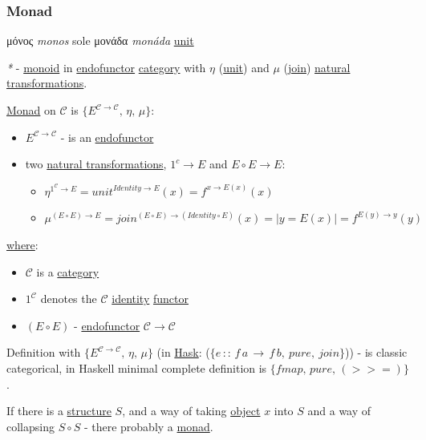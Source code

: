 \documentclass[a4paper,14pt,oneside]{book}
\begin{document}
\subsubsection{\label{orged38b8b}Monad}
\label{sec:org4ab8bff}
μόνος \emph{monos} sole
μονάδα \emph{monáda} \hyperref[org827ec48]{unit}

\emph{*} - \hyperref[orgb10cc2a]{monoid} in \hyperref[org30698a4]{endofunctor} \hyperref[orge2e250a]{category} with \(\eta\) (\hyperref[org827ec48]{unit}) and \(\mu\) (\hyperref[org47dd8e8]{join}) \hyperref[orgc5c07a5]{natural transformations}.

\hyperref[orged38b8b]{Monad} on \(\mathcal{C}\) is \(\{E^{\mathcal{C \to C}}, \, \eta, \, \mu\}\):
\begin{itemize}
\item \(E^{\mathcal{C \to C}}\) - is an \hyperref[org30698a4]{endofunctor}
\item two \hyperref[orgc5c07a5]{natural transformations}, \(1^c \to E\) and \(E \circ E \to E\):
\begin{itemize}
\item \(\eta^{1^{\mathcal{C}} \to E} = {unit}^{Identity \to E}(x) = f^{ x \to E(x)}(x)\)
\item \(\mu^{(E \circ E) \to E} = {join}^{(E \circ E) \to (Identity \circ E)}(x) = | y = E(x) | = f^{E (y) \to y}(y)\)
\end{itemize}
\end{itemize}

\hyperref[org6c63c7a]{where}:
\begin{itemize}
\item \(\mathcal{C}\) is a \hyperref[orge2e250a]{category}
\item \(1^{\mathcal{C}}\) denotes the \(\mathcal{C}\) \hyperref[orgc014b57]{identity} \hyperref[org61d5270]{functor}
\item \((E \circ E)\) - \hyperref[org30698a4]{endofunctor} \(\mathcal{C \to C}\)
\end{itemize}

Definition with \(\{E^{\mathcal{C \to C}}, \, \eta, \, \mu\}\) (in \hyperref[org70e1f79]{Hask}: (\(\{e \, :: \, f \, a \, \to \, f \, b, \ pure, \ join\}\))) - is classic categorical, in Haskell minimal complete definition is \(\{fmap, \, pure, \, (>>=)\}\).

If there is a \hyperref[org2f3ef45]{structure} \(S\), and a way of taking \hyperref[orged022cb]{object} \(x\) into \(S\) and a way of collapsing \(S \circ S\) - there probably a \hyperref[orged38b8b]{monad}.
\end{document}
